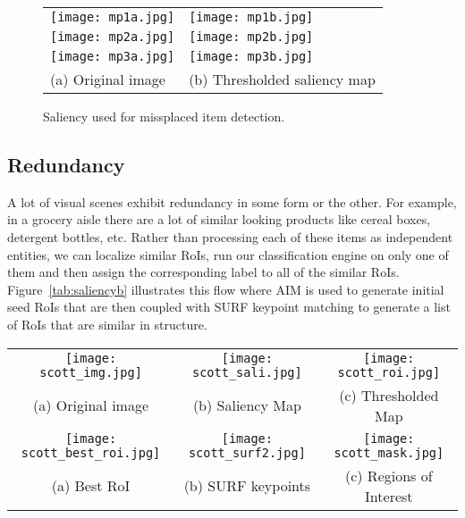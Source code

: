 \begin{figure}[!htb]
\centering
\begin{tabular}{@{}l@{} @{}l@{}}
\vspace{-5pt}
\texttt{[image: mp1a.jpg]} & \texttt{[image: mp1b.jpg]}\\[\abovecaptionskip]
\texttt{[image: mp2a.jpg]} & \texttt{[image: mp2b.jpg]}\\[\abovecaptionskip]
\texttt{[image: mp3a.jpg]} & \texttt{[image: mp3b.jpg]}\\[\abovecaptionskip]
\small(a) Original image & \small (b) Thresholded saliency map\\
\end{tabular}
\caption{Saliency used for missplaced item detection.}
\label{tab:saliencya}
\end{figure}

\subsection{Redundancy}
A lot of visual scenes exhibit redundancy in some form or the other. 
For example, in a grocery aisle there are a lot of similar looking products like cereal boxes, detergent bottles, etc. Rather than processing each of these items 
as independent entities, we can localize similar RoIs, run our classification engine on only one of them and then assign the corresponding label to all of the similar 
RoIs. Figure~\ref{tab:saliencyb} illustrates this flow where AIM is used to generate initial seed RoIs that are then coupled with SURF keypoint matching 
to generate a list of RoIs that are similar in structure. 

\begin{figure*}[!htb]
\centering
\begin{tabular}{@{}c@{} @{}c@{} @{}c@{}}
\vspace{-5pt}
\texttt{[image: scott\_img.jpg]} & \texttt{[image: scott\_sali.jpg]} & \texttt{[image: scott\_roi.jpg]}\\[\abovecaptionskip]
\small(a) Original image & \small (b) Saliency Map & \small (c) Thresholded Map \\
\texttt{[image: scott\_best\_roi.jpg]} & \texttt{[image: scott\_surf2.jpg]} & \texttt{[image: scott\_mask.jpg]}\\[\abovecaptionskip]
\small(a) Best RoI & \small (b) SURF keypoints & \small (c) Regions of Interest \\
\end{tabular}
\caption{Saliency and SURF used to identify similar items.}
\label{tab:saliencyb}
\end{figure*}

